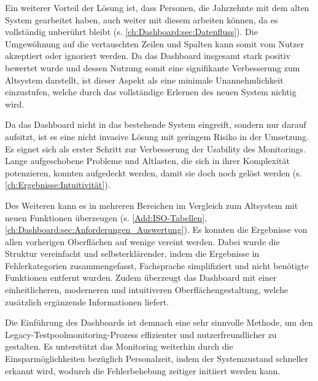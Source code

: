 Ein weiterer Vorteil der Lösung ist, dass Personen, die Jahrzehnte mit dem alten System gearbeitet haben, auch weiter mit diesem arbeiten können, da es vollständig unberührt bleibt (s. \autoref{ch:Dashboard:sec:Datenfluss}). Die Umgewöhnung auf die vertauschten Zeilen und Spalten kann somit vom Nutzer akzeptiert oder ignoriert werden. Da das Dash\-board insgesamt stark positiv bewertet wurde und dessen Nutzung somit eine signifikante Verbesserung zum Altsystem darstellt, ist dieser Aspekt als eine minimale Unannehmlichkeit einzustufen, welche durch das vollständige Erlernen des neuen System nichtig wird.

Da das Dash\-board nicht in das bestehende System eingreift, sondern nur darauf aufsitzt, ist es eine nicht invasive Lösung mit geringem Risiko in der Umsetzung. Es eignet sich als erster Schritt zur Verbesserung der Usability des Monitorings. Lange aufgeschobene Probleme und Altlasten, die sich in ihrer Komplexität potenzieren, konnten aufgedeckt werden, damit sie doch noch gelöst werden (s. \autoref{ch:Ergebnisse:Intuitivität}).

Des Weiteren kann es in mehreren Bereichen im Vergleich zum Altsystem mit neuen Funktionen überzeugen (s. \autoref{Add:ISO-Tabellen}, \autoref{ch:Dashboard:sec:Anforderungen_Auswertung}).
Es konnten die Ergebnisse von allen vorherigen Oberflächen auf wenige vereint werden. Dabei wurde die Struktur vereinfacht und selbsterklärender, indem die Ergebnisse in Fehlerkategorien zusammengefasst, Fachsprache simplifiziert und nicht benötigte Funktionen entfernt wurden. Zudem überzeugt das Dash\-board mit einer einheitlicheren, moderneren und intuitiveren Oberflächengestaltung, welche zusätzlich ergänzende Informationen liefert.


Die Einführung des Dash\-boards ist demnach eine sehr sinnvolle Methode, um den Legacy-Testpoolmonitoring-Prozess effizienter und nutzerfreundlicher zu gestalten. Es unterstützt das Monitoring weiterhin durch die Einsparmöglichkeiten bezüglich Personalzeit, indem der Systemzustand schneller erkannt wird, wodurch die Fehlerbehebung zeitiger initiiert werden kann. %


